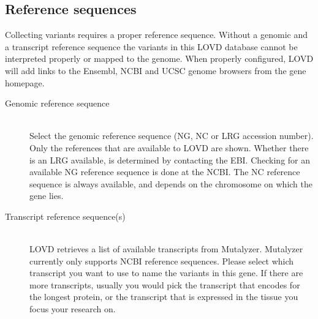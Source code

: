 \documentclass[a4paper,oneside,openany,12pt]{memoir}
\begin{document}
\subsection{Reference sequences}
Collecting variants requires a proper reference sequence.
Without a genomic and a transcript reference sequence the variants in this LOVD database cannot be interpreted properly or mapped to the genome.
When properly configured, LOVD will add links to the Ensembl, NCBI and UCSC genome browsers from the gene homepage.%
\begin{description}
  \item[Genomic reference sequence] \hfill \\
  Select the genomic reference sequence (NG, NC or LRG accession number).
  Only the references that are available to LOVD are shown.
  Whether there is an LRG available, is determined by contacting the EBI.
  Checking for an available NG reference sequence is done at the NCBI.
  The NC reference sequence is always available, and depends on the chromosome on which the gene lies.
  \item[Transcript reference sequence(s)] \hfill \\
  LOVD retrieves a list of available transcripts from Mutalyzer.
  Mutalyzer currently only supports NCBI reference sequences.
  Please select which transcript you want to use to name the variants in this gene.
  If there are more transcripts, usually you would pick the transcript that encodes for the longest protein, or the transcript that is expressed in the tissue you focus your research on.
\end{description}
\end{document}
